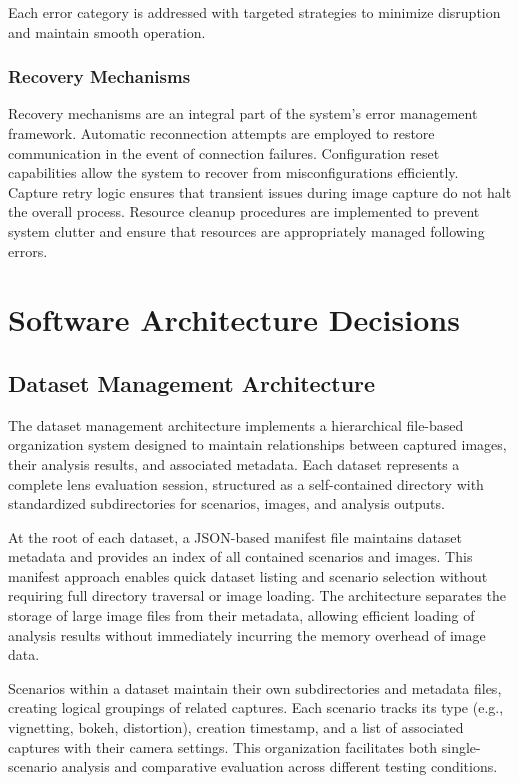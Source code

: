 Each error category is addressed with targeted strategies to minimize disruption and maintain smooth operation.

\subsubsection{Recovery Mechanisms}
Recovery mechanisms are an integral part of the system’s error management framework. Automatic reconnection attempts are employed to restore communication in the event of connection failures. Configuration reset capabilities allow the system to recover from misconfigurations efficiently. Capture retry logic ensures that transient issues during image capture do not halt the overall process. Resource cleanup procedures are implemented to prevent system clutter and ensure that resources are appropriately managed following errors.

\section{Software Architecture Decisions}

\subsection{Dataset Management Architecture}
The dataset management architecture implements a hierarchical file-based organization system designed to maintain relationships between captured images, their analysis results, and associated metadata. Each dataset represents a complete lens evaluation session, structured as a self-contained directory with standardized subdirectories for scenarios, images, and analysis outputs.

At the root of each dataset, a JSON-based manifest file maintains dataset metadata and provides an index of all contained scenarios and images. This manifest approach enables quick dataset listing and scenario selection without requiring full directory traversal or image loading. The architecture separates the storage of large image files from their metadata, allowing efficient loading of analysis results without immediately incurring the memory overhead of image data.

Scenarios within a dataset maintain their own subdirectories and metadata files, creating logical groupings of related captures. Each scenario tracks its type (e.g., vignetting, bokeh, distortion), creation timestamp, and a list of associated captures with their camera settings. This organization facilitates both single-scenario analysis and comparative evaluation across different testing conditions.

